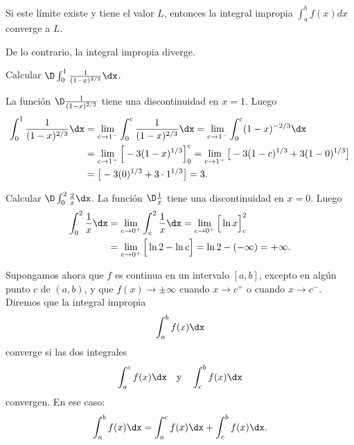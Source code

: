 Si este límite existe y tiene el valor $L$, entonces la integral impropia $\int_{a}^{b}f(x)dx$ converge a $L$.

De lo contrario, la integral impropia diverge.

\begin{example}
Calcular $\D \int_0^1 \frac{1}{(1-x)^{2/3}}\dx$.

La función $\D \frac{1}{(1-x)^{2/3}}$ tiene una discontinuidad en $x=1$.
      Luego
      \begin{align*}
        \int_0^1 \frac{1}{(1-x)^{2/3}}\dx 
        &= 
        \lim_{c\to 1^-} \int_0^c \frac{1}{(1-x)^{2/3}} \dx 
        = 
        \lim_{c\to 1^-} \int_0^c (1-x)^{-2/3} \dx 
        \\
        &= 
        \lim_{c\to 1^-} \Big[-3(1-x)^{1/3}\Big]_0^c
        = 
        \lim_{c\to 1^-} \big[-3(1-c)^{1/3}+3(1-0)^{1/3}\big]
        \\
        &= 
        \big[-3(0)^{1/3}+3 \cdot 1^{1/3}\big] = 3.
      \end{align*}
\end{example}

\begin{example}
  Calcular $\D \int_0^2 \frac{2}{x} \dx$.
    La función $\D \frac{1}{x}$ tiene una discontinuidad en $x=0$.
      Luego
      \begin{align*}
        \int_0^2 \frac{1}{x}\dx 
        &= \lim_{c\to 0^+} \int_c^2 \frac{1}{x}\dx
        = \lim_{c\to 0^+} \Big[\ln x\Big]_c^2
        \\
        &= \lim_{c\to 0^+} \Big[ \ln 2 - \ln c \Big]
        = \ln 2 - (-\infty) = +\infty.
      \end{align*}
\end{example}

Supongamos ahora que $f$ es continua en un intervalo $[a,b]$, excepto en algún punto $c$ de $(a,b)$, y que $f(x) \to \pm \infty$ cuando $x \to c^{+}$ o cuando $x \to c^{-}$. Diremos que la integral impropia 
\[\int_{a}^{b}f(x)\dx\]
converge si las dos integrales 
\[\int_{a}^{c}f(x)\dx \quad \text{y} \quad \int_{c}^{b}f(x)\dx\]
convergen. En ese caso:
\[
\int_a^b f(x) \dx = \int_{a}^{c}f(x)\dx + \int_{c}^{b}f(x)\dx.
\]

